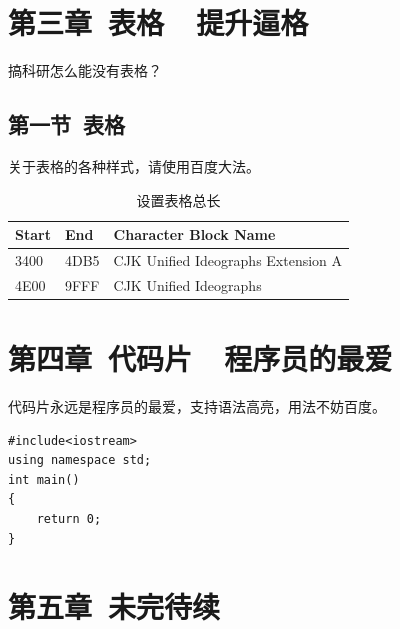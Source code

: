 \documentclass{ctexart}
\begin{document}


\clearpage
\section{第三章\ 表格\ \ 提升逼格}

搞科研怎么能没有表格？\\

\subsection{第一节\ 表格}

关于表格的各种样式，请使用百度大法。\\
\begin{table}[H]
\caption{设置表格总长} 
\begin{tabular*}{12cm}{lll}
\hline  
Start & End  & Character Block Name \\  
\hline  
3400  & 4DB5 & CJK Unified Ideographs Extension A \\  
4E00  & 9FFF & CJK Unified Ideographs \\  
\hline  
\end{tabular*} 
\end{table} 



\section{第四章\ 代码片\ \ 程序员的最爱}
代码片永远是程序员的最爱，支持语法高亮，用法不妨百度。\\
\lstset{language=C}
\begin{lstlisting}
#include<iostream>
using namespace std;
int main()
{
    return 0;
}
\end{lstlisting}


\clearpage

\section{第五章\ 未完待续}
\end{document}
